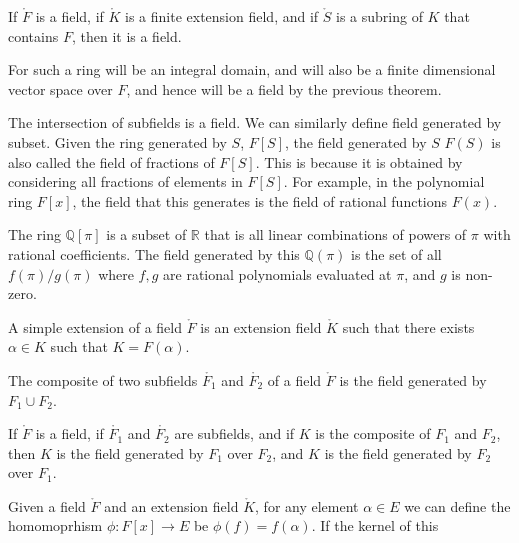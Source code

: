     \begin{theorem}
        If $\ring{F}$ is a field, if $\ring{K}$ is a finite extension field,
        and if $\ring{S}$ is a subring of $K$ that contains $F$, then it is
        a field.
    \end{theorem}
    \begin{theorem}
        For such a ring will be an integral domain, and will also be a
        finite dimensional vector space over $F$, and hence will be a field
        by the previous theorem.
    \end{theorem}
    The intersection of subfields is a field. We can similarly define field
    generated by subset. Given the ring generated by $S$, $F[S]$, the field
    generated by $S$ $F(S)$ is also called the field of fractions of $F[S]$.
    This is because it is obtained by considering all fractions of elements
    in $F[S]$. For example, in the polynomial ring $F[x]$, the field that
    this generates is the field of rational functions $F(x)$.
    \begin{example}
        The ring $\mathbb{Q}[\pi]$ is a subset of $\mathbb{R}$ that is all
        linear combinations of powers of $\pi$ with rational coefficients.
        The field generated by this $\mathbb{Q}(\pi)$ is the set of all
        $f(\pi)/g(\pi)$ where $f,g$ are rational polynomials evaluated at
        $\pi$, and $g$ is non-zero.
    \end{example}
    \begin{definition}
        A simple extension of a field $\ring{F}$ is an extension field
        $\ring{K}$ such that there exists $\alpha\in{K}$ such that
        $K=F(\alpha)$.
    \end{definition}
    \begin{definition}
        The composite of two subfields $\ring{F_{1}}$ and $\ring{F_{2}}$
        of a field $\ring{F}$ is the field generated by $F_{1}\cup{F}_{2}$.
    \end{definition}
    \begin{theorem}
        If $\ring{F}$ is a field, if $\ring{F_{1}}$ and $\ring{F_{2}}$ are
        subfields, and if $K$ is the composite of $F_{1}$ and $F_{2}$,
        then $K$ is the field generated by $F_{1}$ over $F_{2}$, and $K$ is
        the field generated by $F_{2}$ over $F_{1}$.
    \end{theorem}
    Given a field $\ring{F}$ and an extension field $\ring{K}$, for any
    element $\alpha\in{E}$ we can define the homomoprhism
    $\phi:F[x]\rightarrow{E}$ be $\phi(f)=f(\alpha)$. If the kernel of this
